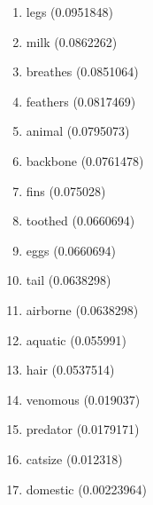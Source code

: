 \begin{enumerate}
\item legs (0.0951848)
\item milk (0.0862262)
\item breathes (0.0851064)
\item feathers (0.0817469)
\item animal (0.0795073)
\item backbone (0.0761478)
\item fins (0.075028)
\item toothed (0.0660694)
\item eggs (0.0660694)
\item tail (0.0638298)
\item airborne (0.0638298)
\item aquatic (0.055991)
\item hair (0.0537514)
\item venomous (0.019037)
\item predator (0.0179171)
\item catsize (0.012318)
\item domestic (0.00223964)
\end{enumerate}